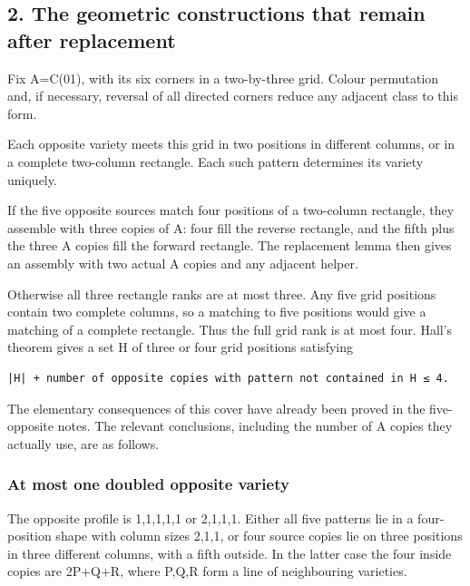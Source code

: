 \documentclass[
  10pt,
]{article}
\begin{document}
\hypertarget{the-geometric-constructions-that-remain-after-replacement}{%
\subsection*{2. The geometric constructions that remain after
replacement}\label{the-geometric-constructions-that-remain-after-replacement}}

Fix A=C(01), with its six corners in a two-by-three grid. Colour
permutation and, if necessary, reversal of all directed corners reduce
any adjacent class to this form.

Each opposite variety meets this grid in two positions in different
columns, or in a complete two-column rectangle. Each such pattern
determines its variety uniquely.

If the five opposite sources match four positions of a two-column
rectangle, they assemble with three copies of A: four fill the reverse
rectangle, and the fifth plus the three A copies fill the forward
rectangle. The replacement lemma then gives an assembly with two actual
A copies and any adjacent helper.

Otherwise all three rectangle ranks are at most three. Any five grid
positions contain two complete columns, so a matching to five positions
would give a matching of a complete rectangle. Thus the full grid rank
is at most four. Hall's theorem gives a set H of three or four grid
positions satisfying

\begin{verbatim}
|H| + number of opposite copies with pattern not contained in H ≤ 4.
\end{verbatim}

The elementary consequences of this cover have already been proved in
the five-opposite notes. The relevant conclusions, including the number
of A copies they actually use, are as follows.

\hypertarget{at-most-one-doubled-opposite-variety}{%
\subsubsection*{At most one doubled opposite
variety}\label{at-most-one-doubled-opposite-variety}}

The opposite profile is 1,1,1,1,1 or 2,1,1,1. Either all five patterns
lie in a four-position shape with column sizes 2,1,1, or four source
copies lie on three positions in three different columns, with a fifth
outside. In the latter case the four inside copies are 2P+Q+R, where
P,Q,R form a line of neighbouring varieties.
\end{document}
